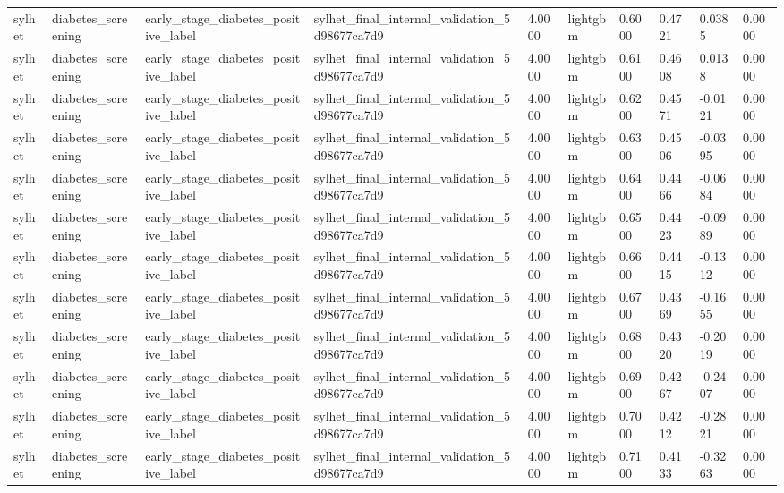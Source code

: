 \begin{tabular}{llllllllll}
sylhet & diabetes\_screening & early\_stage\_diabetes\_positive\_label & sylhet\_final\_internal\_validation\_5d98677ca7d9 & 4.0000 & lightgbm & 0.6000 & 0.4721 & 0.0385 & 0.0000 \\
sylhet & diabetes\_screening & early\_stage\_diabetes\_positive\_label & sylhet\_final\_internal\_validation\_5d98677ca7d9 & 4.0000 & lightgbm & 0.6100 & 0.4608 & 0.0138 & 0.0000 \\
sylhet & diabetes\_screening & early\_stage\_diabetes\_positive\_label & sylhet\_final\_internal\_validation\_5d98677ca7d9 & 4.0000 & lightgbm & 0.6200 & 0.4571 & -0.0121 & 0.0000 \\
sylhet & diabetes\_screening & early\_stage\_diabetes\_positive\_label & sylhet\_final\_internal\_validation\_5d98677ca7d9 & 4.0000 & lightgbm & 0.6300 & 0.4506 & -0.0395 & 0.0000 \\
sylhet & diabetes\_screening & early\_stage\_diabetes\_positive\_label & sylhet\_final\_internal\_validation\_5d98677ca7d9 & 4.0000 & lightgbm & 0.6400 & 0.4466 & -0.0684 & 0.0000 \\
sylhet & diabetes\_screening & early\_stage\_diabetes\_positive\_label & sylhet\_final\_internal\_validation\_5d98677ca7d9 & 4.0000 & lightgbm & 0.6500 & 0.4423 & -0.0989 & 0.0000 \\
sylhet & diabetes\_screening & early\_stage\_diabetes\_positive\_label & sylhet\_final\_internal\_validation\_5d98677ca7d9 & 4.0000 & lightgbm & 0.6600 & 0.4415 & -0.1312 & 0.0000 \\
sylhet & diabetes\_screening & early\_stage\_diabetes\_positive\_label & sylhet\_final\_internal\_validation\_5d98677ca7d9 & 4.0000 & lightgbm & 0.6700 & 0.4369 & -0.1655 & 0.0000 \\
sylhet & diabetes\_screening & early\_stage\_diabetes\_positive\_label & sylhet\_final\_internal\_validation\_5d98677ca7d9 & 4.0000 & lightgbm & 0.6800 & 0.4320 & -0.2019 & 0.0000 \\
sylhet & diabetes\_screening & early\_stage\_diabetes\_positive\_label & sylhet\_final\_internal\_validation\_5d98677ca7d9 & 4.0000 & lightgbm & 0.6900 & 0.4267 & -0.2407 & 0.0000 \\
sylhet & diabetes\_screening & early\_stage\_diabetes\_positive\_label & sylhet\_final\_internal\_validation\_5d98677ca7d9 & 4.0000 & lightgbm & 0.7000 & 0.4212 & -0.2821 & 0.0000 \\
sylhet & diabetes\_screening & early\_stage\_diabetes\_positive\_label & sylhet\_final\_internal\_validation\_5d98677ca7d9 & 4.0000 & lightgbm & 0.7100 & 0.4133 & -0.3263 & 0.0000 \\

\end{tabular}
